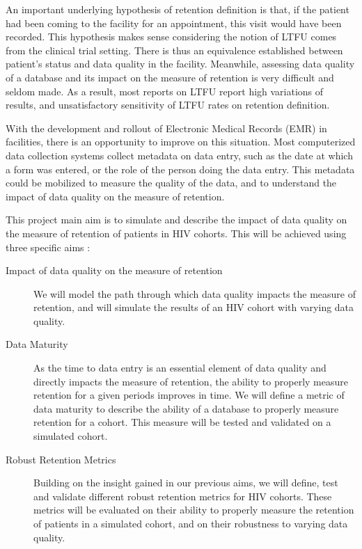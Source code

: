 An important underlying hypothesis of retention definition is that, if the patient had been coming to the facility for an appointment, this visit would have been recorded. This hypothesis makes sense considering the notion of LTFU comes from the clinical trial setting\cite{lebouche_incidence_2006}. There is thus an equivalence established between patient's status and data quality in the facility. Meanwhile, assessing data quality of a database and its impact on the measure of retention is very difficult and seldom made. As a result, most reports on LTFU report high variations of results, and unsatisfactory sensitivity of LTFU rates on retention definition. %

With the development and rollout of Electronic Medical Records (EMR) in facilities, there is an opportunity to improve on this situation. Most computerized data collection systems collect metadata on data entry, such as the date at which a form was entered, or the role of the person doing the data entry. This metadata could be mobilized to measure the quality of the data, and to understand the impact of data quality on the measure of retention.

This project main aim is to simulate and describe the impact of data quality on the measure of retention of patients in HIV cohorts. This will be achieved using three specific aims :

\begin{description}
	\item[Impact of data quality on the measure of retention] We will model the path through which data quality impacts the measure of retention, and will simulate the results of an HIV cohort with varying data quality.
	\item[Data Maturity] As the time to data entry is an essential element of data quality and directly impacts the measure of retention, the ability to properly measure retention for a given periods improves in time. We will define a metric of data maturity to describe the ability of a database to properly measure retention for a cohort. This measure will be tested and validated on a simulated cohort.
	\item[Robust Retention Metrics] Building on the insight gained in our previous aims, we will define, test and validate different robust retention metrics for HIV cohorts. These metrics will be evaluated on their ability to properly measure the retention of patients in a simulated cohort, and on their robustness to varying data quality.
\end{description}


